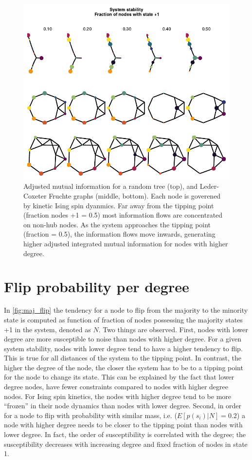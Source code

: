 \documentclass[a4paper, 11pt, twocolumn]{article}
\begin{document}
\begin{figure}
\centering
\includegraphics[width=.9\linewidth]{./figures/imi_other_graphs.pdf}
\caption{\label{fig:other_systems}Adjusted mutual information for a random tree (top), and Leder-Coxeter Fruchte graphs (middle, bottom). Each node is goverened by kinetic Ising spin dyanmics. Far away from the tipping point (fraction nodes +1 = 0.5) most information flows are concentrated on non-hub nodes. As the system approaches the tipping point (fraction = 0.5), the information flows move inwards, generating higher adjusted integrated mutual information for nodes with higher degree.}
\end{figure}

\section{Flip probability per degree}
\label{sec:deg_flip}
In \cref{fig:maj_flip} the tendency for a node
to flip from the majority  to the minority state is computed
as  function of  fraction of  nodes possessing  the majority
states +1  in the system,  denoted as \(N\). Two  things are
observed.   First,  nodes   with  lower   degree  are   more
susceptible to  noise than nodes  with higher degree.  For a
given system stability, nodes with lower degree tend to have
a higher tendency to flip. This is true for all distances of
the system to the tipping point. In contrast, the higher the
degree of  the node, the  closer the system  has to be  to a
tipping point for the node to  change its state. This can be
explained by  the fact that  lower degree nodes,  have fewer
constraints compared to nodes  with higher degree nodes. For
Ising spin kinetics, the nodes with higher degree tend to be
more ``frozen'' in  their node dynamics than  nodes with lower
degree. Second, in order for a node to flip with probability
with similar  mass, i.e.  (\(E[p(s_i) | N]  = 0.2\))  a node
with higher degree  needs to be closer to  the tipping point
than  nodes  with  lower  degree.  In  fact,  the  order  of
susceptibility   is   correlated   with  the   degree;   the
susceptibility  decreases with  increasing degree  and fixed
fraction of nodes in state 1.
\end{document}
